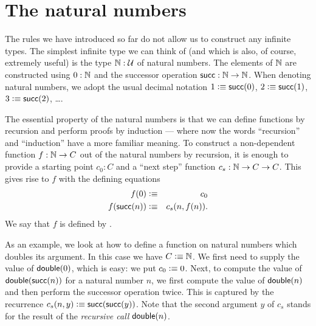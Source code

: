 %


\section{The natural numbers}
\label{sec:inductive-types}

%
%
%
The rules we have introduced so far do not allow us to construct any infinite types.
The simplest infinite type we can think of (and which is also, of course, extremely useful) is the type $\mathbb{N} : \mathcal{U}$ of natural numbers.
The elements of $\mathbb{N}$ are constructed using $0 : \mathbb{N}$ and the successor operation $\mathsf{succ} : \mathbb{N} \to \mathbb{N}$.
When denoting natural numbers, we adopt the usual decimal notation $1 \vcentcolon\equiv \mathsf{succ}(0)$, $2 \vcentcolon\equiv \mathsf{succ}(1)$, $3 \vcentcolon\equiv \mathsf{succ}(2)$, \dots.

The essential property of the natural numbers is that we can define functions by recursion and perform proofs by induction --- where now the words ``recursion'' and ``induction'' have a more familiar meaning.
%
To construct a non-dependent function $f : \mathbb{N} \to C$ out of the natural numbers by recursion, it is enough to provide a starting point $c_0 : C$ and a ``next step'' function $c_s : \mathbb{N} \to C \to C$.
This gives rise to $f$ with the defining equations
\begin{eqnarray*}
  f(0) & \vcentcolon\equiv & c_0 \\
  f(\mathsf{succ}(n)) & \vcentcolon\equiv & c_s(n,f(n)).
\end{eqnarray*}
We say that $f$ is defined by .
%
%

As an example, we look at how to define a function on natural numbers which doubles its argument.
In this case we have $C\vcentcolon\equiv \mathbb{N}$.
We first need to supply the value of $\mathsf{double}(0)$, which is easy: we put $c_0 \vcentcolon\equiv 0$.
Next, to compute the value of $\mathsf{double}(\mathsf{succ}(n))$ for a natural number $n$, we first compute the value of $\mathsf{double}(n)$ and then perform the successor operation twice.
This is captured by the recurrence $c_s(n,y) \vcentcolon\equiv \mathsf{succ}(\mathsf{succ}(y))$.
Note that the second argument $y$ of $c_s$ stands for the result of the \emph{recursive call} $\mathsf{double}(n)$.

